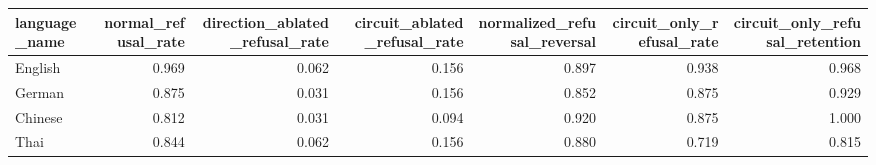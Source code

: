 \begin{tabular}{lrrrrrr}
\toprule
language\_name & normal\_refusal\_rate & direction\_ablated\_refusal\_rate & circuit\_ablated\_refusal\_rate & normalized\_refusal\_reversal & circuit\_only\_refusal\_rate & circuit\_only\_refusal\_retention \\
\midrule
English & 0.969 & 0.062 & 0.156 & 0.897 & 0.938 & 0.968 \\
German & 0.875 & 0.031 & 0.156 & 0.852 & 0.875 & 0.929 \\
Chinese & 0.812 & 0.031 & 0.094 & 0.920 & 0.875 & 1.000 \\
Thai & 0.844 & 0.062 & 0.156 & 0.880 & 0.719 & 0.815 \\
\bottomrule
\end{tabular}

